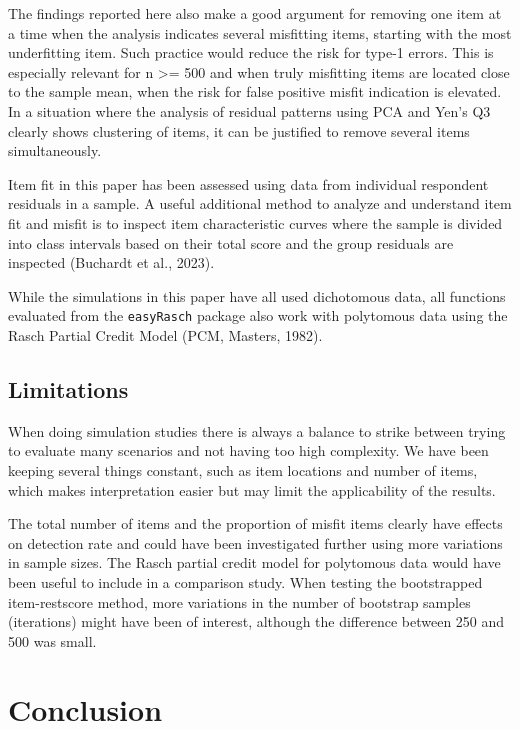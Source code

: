\documentclass[
  letterpaper,
  DIV=11,
  numbers=noendperiod]{scrartcl}
\begin{document}
The findings reported here also make a good argument for removing one
item at a time when the analysis indicates several misfitting items,
starting with the most underfitting item. Such practice would reduce the
risk for type-1 errors. This is especially relevant for n \textgreater=
500 and when truly misfitting items are located close to the sample
mean, when the risk for false positive misfit indication is elevated. In
a situation where the analysis of residual patterns using PCA and Yen's
Q3 clearly shows clustering of items, it can be justified to remove
several items simultaneously.

Item fit in this paper has been assessed using data from individual
respondent residuals in a sample. A useful additional method to analyze
and understand item fit and misfit is to inspect item characteristic
curves where the sample is divided into class intervals based on their
total score and the group residuals are inspected (Buchardt et al.,
2023).

While the simulations in this paper have all used dichotomous data, all
functions evaluated from the \texttt{easyRasch} package also work with
polytomous data using the Rasch Partial Credit Model (PCM, Masters,
1982).

\subsection{Limitations}\label{limitations}

When doing simulation studies there is always a balance to strike
between trying to evaluate many scenarios and not having too high
complexity. We have been keeping several things constant, such as item
locations and number of items, which makes interpretation easier but may
limit the applicability of the results.

The total number of items and the proportion of misfit items clearly
have effects on detection rate and could have been investigated further
using more variations in sample sizes. The Rasch partial credit model
for polytomous data would have been useful to include in a comparison
study. When testing the bootstrapped item-restscore method, more
variations in the number of bootstrap samples (iterations) might have
been of interest, although the difference between 250 and 500 was small.

\section{Conclusion}\label{conclusion}
\end{document}
